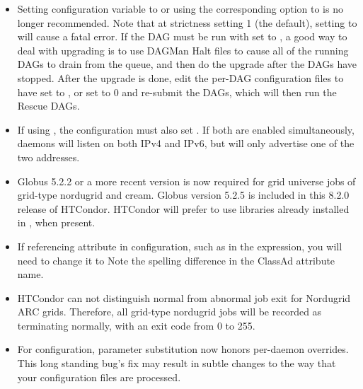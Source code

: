 \begin{itemize}
\item Setting configuration variable
 to 
or using the corresponding  option
to  is no longer recommended.
Note that at strictness setting 1 (the default), setting
 to 
will cause a fatal error. 
If the DAG must be run with  
set to ,
a good way to deal with upgrading is to use DAGMan Halt files 
to cause all of the running DAGs to drain from the queue, 
and then do the upgrade after the DAGs have stopped.  
After the upgrade is done, 
edit the per-DAG configuration files to have 
 set to ,
or set  to 0 and 
re-submit the DAGs, which will then run the Rescue DAGs.

\item If using , the configuration must
also set .
If both are enabled simultaneously,
daemons will listen on both IPv4 and IPv6, 
but will only advertise one of the two addresses.

\item Globus 5.2.2 or a more recent version is now required 
for grid universe jobs of grid-type nordugrid and cream.
Globus version 5.2.5 is included in this 8.2.0 release of HTCondor.
HTCondor will prefer to use libraries already installed in ,
when present.

\item If referencing attribute  in
configuration, such as in the  expression,
you will need to change it to  
Note the spelling difference in the ClassAd attribute name.

\item HTCondor can not distinguish normal from abnormal job exit
for Nordugrid ARC grids.
Therefore, all grid-type nordugrid jobs will be recorded as 
terminating normally, with an exit code from 0 to 255.

\item For configuration, parameter substitution now honors per-daemon 
overrides.  This long standing bug's fix may result in subtle changes
to the way that your configuration files are processed.

\end{itemize}

